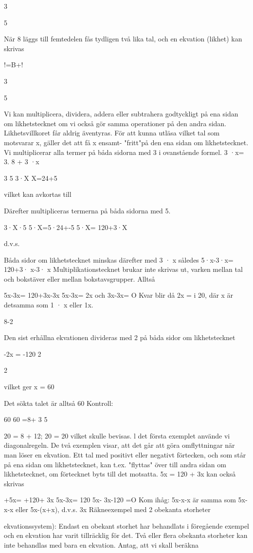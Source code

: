 \documentclass[a4paper,twoside,twocolumn,openright]{book}
\begin{document}
{{{{3

5

När 8 läggs till femtedelen fås tydligen två
lika tal, och en ekvation (likhet) kan skrivas

!=B+!

3

5

Vi kan multiplicera, dividera, addera eller
subtrahera godtyckligt på ena sidan om likhetstecknet om vi också gör samma operationer på den andra sidan.
Likhetsvillkoret får aldrig äventyras.
För att kunna utläsa vilket tal som motsvarar x, gäller det att få x ensamt- "fritt"på den ena sidan om likhetstecknet.
Vi multiplicerar alla termer på båda sidorna med 3 i ovanstående formel.
3 ·x= 3. 8 + 3 ·x

3
5
3·X
X=24+5

vilket kan avkortas till

Därefter multipliceras termerna på båda
sidorna med 5.

3·X·5
5·X=5·24+-5
5·X= 120+3·X

d.v.s.

Båda sidor om likhetstecknet minskas
därefter med 3 · x
således 5·x-3·x= 120+3· x-3· x
Multiplikationstecknet brukar inte skrivas
ut, varken mellan tal och bokstäver eller
mellan bokstavsgrupper. Alltså

5x-3x= 120+3x-3x
5x-3x= 2x och 3x-3x= O
Kvar blir då 2x = i 20,
där x är detsamma som 1 · x eller 1x.

8-2

Den sist erhållna ekvationen divideras med
2 på båda sidor om likhetstecknet

-2x = -120
2

2

vilket ger x = 60

Det sökta talet är alltså 60
Kontroll:

60
60
=8+
3
5

20 = 8 + 12; 20 = 20 vilket skulle bevisas.
l det första exemplet använde vi diagonalregeln. De två exemplen visar, att det går att
göra omflyttningar när man löser en ekvation. Ett tal med positivt eller negativt förtecken, och som står på ena sidan om likhetstecknet, kan t.ex. "flyttas" över till andra
sidan om likhetstecknet, om förtecknet byts
till det motsatta.
5x = 120 + 3x kan också skrivas

+5x= +120+ 3x
5x-3x= 120
5x- 3x-120 =O
Kom ihåg: 5x-x-x är samma som
5x-x-x eller 5x-(x+x), d.v.s. 3x
Räkneexempel med 2 obekanta storheter
{ekvationssystem):
Endast en obekant storhet har behandlats i
föregående exempel och en ekvation har
varit tillräcklig för det.
Två eller flera obekanta storheter kan
inte behandlas med bara en ekvation.
Antag, att vi skall beräkna

}}}}}
\end{document}
